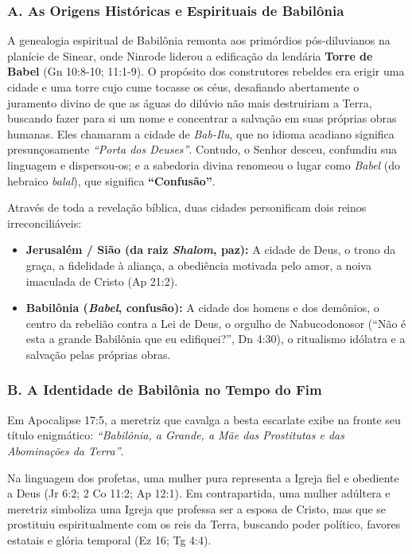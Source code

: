 \subsubsection*{A. As Origens Históricas e Espirituais de Babilônia}

A genealogia espiritual de Babilônia remonta aos primórdios pós-diluvianos na planície de Sinear, onde Ninrode liderou a edificação da lendária \textbf{Torre de Babel} (Gn 10:8-10; 11:1-9). O propósito dos construtores rebeldes era erigir uma cidade e uma torre cujo cume tocasse os céus, desafiando abertamente o juramento divino de que as águas do dilúvio não mais destruiriam a Terra, buscando fazer para si um nome e concentrar a salvação em suas próprias obras humanas. Eles chamaram a cidade de \textit{Bab-Ilu}, que no idioma acadiano significa presunçosamente \textit{``Porta dos Deuses''}. Contudo, o Senhor desceu, confundiu sua linguagem e dispersou-os; e a sabedoria divina renomeou o lugar como \textit{Babel} (do hebraico \textit{balal}), que significa \textbf{``Confusão''}.

Através de toda a revelação bíblica, duas cidades personificam dois reinos irreconciliáveis:
\begin{itemize}
  \item \textbf{Jerusalém / Sião (da raiz \textit{Shalom}, paz):} A cidade de Deus, o trono da graça, a fidelidade à aliança, a obediência motivada pelo amor, a noiva imaculada de Cristo (Ap 21:2).
  \item \textbf{Babilônia (\textit{Babel}, confusão):} A cidade dos homens e dos demônios, o centro da rebelião contra a Lei de Deus, o orgulho de Nabucodonosor (``Não é esta a grande Babilônia que eu edifiquei?'', Dn 4:30), o ritualismo idólatra e a salvação pelas próprias obras.
\end{itemize}



\subsubsection*{B. A Identidade de Babilônia no Tempo do Fim}

Em Apocalipse 17:5, a meretriz que cavalga a besta escarlate exibe na fronte seu título enigmático: \textit{``Babilônia, a Grande, a Mãe das Prostitutas e das Abominações da Terra''}.

Na linguagem dos profetas, uma mulher pura representa a Igreja fiel e obediente a Deus (Jr 6:2; 2 Co 11:2; Ap 12:1). Em contrapartida, uma mulher adúltera e meretriz simboliza uma Igreja que professa ser a esposa de Cristo, mas que se prostituiu espiritualmente com os reis da Terra, buscando poder político, favores estatais e glória temporal (Ez 16; Tg 4:4).

